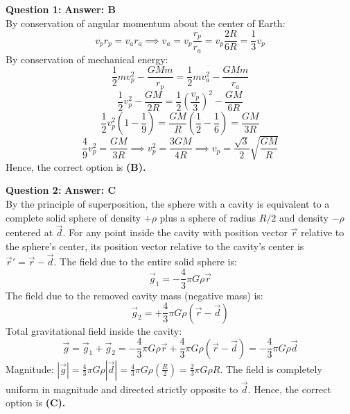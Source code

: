 \documentclass[11pt,a4paper]{article}
\begin{document}
\begin{tcolorbox}[solbox]
  \textbf{\textcolor{primaryDark}{Question 1:}} \hfill \textbf{\textcolor{l3Crimson}{Answer: B}}\\
  \vspace{3pt}
  By conservation of angular momentum about the center of Earth:
$$v_p r_p = v_a r_a \implies v_a = v_p \frac{r_p}{r_a} = v_p \frac{2R}{6R} = \frac{1}{3}v_p$$
\vspace{3pt}
By conservation of mechanical energy:
$$\frac{1}{2}m v_p^2 - \frac{GMm}{r_p} = \frac{1}{2}m v_a^2 - \frac{GMm}{r_a}$$
$$\frac{1}{2}v_p^2 - \frac{GM}{2R} = \frac{1}{2}\left(\frac{v_p}{3}\right)^2 - \frac{GM}{6R}$$
$$\frac{1}{2}v_p^2 \left(1 - \frac{1}{9}\right) = \frac{GM}{R}\left(\frac{1}{2} - \frac{1}{6}\right) = \frac{GM}{3R}$$
$$\frac{4}{9}v_p^2 = \frac{GM}{3R} \implies v_p^2 = \frac{3GM}{4R} \implies v_p = \frac{\sqrt{3}}{2}\sqrt{\frac{GM}{R}}$$
\vspace{3pt}
Hence, the correct option is \textbf{(B)}\textbf{.}
\end{tcolorbox}
\vspace{3pt}

\begin{tcolorbox}[solbox]
  \textbf{\textcolor{primaryDark}{Question 2:}} \hfill \textbf{\textcolor{l3Crimson}{Answer: C}}\\
  \vspace{3pt}
  By the principle of superposition, the sphere with a cavity is equivalent to a complete solid sphere of density $+\rho$ plus a sphere of radius $R/2$ and density $-\rho$ centered at $\vec{d}$.
\vspace{3pt}
For any point inside the cavity with position vector $\vec{r}$ relative to the sphere's center, its position vector relative to the cavity's center is $\vec{r}' = \vec{r} - \vec{d}$.
\vspace{3pt}
The field due to the entire solid sphere is:
$$\vec{g}_1 = -\frac{4}{3}\pi G \rho \vec{r}$$
The field due to the removed cavity mass (negative mass) is:
$$\vec{g}_2 = +\frac{4}{3}\pi G \rho (\vec{r} - \vec{d})$$
\vspace{3pt}
Total gravitational field inside the cavity:
$$\vec{g} = \vec{g}_1 + \vec{g}_2 = -\frac{4}{3}\pi G \rho \vec{r} + \frac{4}{3}\pi G \rho (\vec{r} - \vec{d}) = -\frac{4}{3}\pi G \rho \vec{d}$$
\vspace{3pt}
Magnitude: $|\vec{g}| = \frac{4}{3}\pi G \rho |\vec{d}| = \frac{4}{3}\pi G \rho \left(\frac{R}{2}\right) = \frac{2}{3}\pi G \rho R$.
The field is completely uniform in magnitude and directed strictly opposite to $\vec{d}$.
\vspace{3pt}
Hence, the correct option is \textbf{(C)}\textbf{.}
\end{tcolorbox}
\vspace{3pt}
\end{document}
